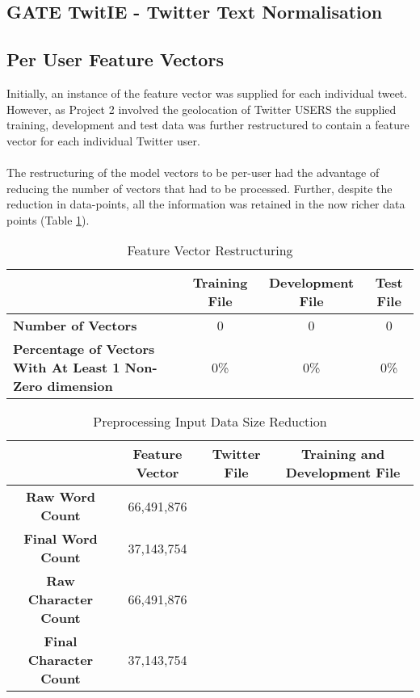\documentclass[11pt]{article}
\begin{document}
\subsection{GATE TwitIE - Twitter Text Normalisation}

\subsection{Per User Feature Vectors}
Initially, an instance of the feature vector was supplied for each individual tweet. However, as Project 2 involved the geolocation of Twitter USERS the supplied training, development and test data was further restructured to contain a feature vector for each individual Twitter user.\\\\
The restructuring of the model vectors to be per-user had the advantage of reducing the number of vectors that had to be processed. Further, despite the reduction in data-points, all the information was retained in the now richer data points (Table \ref{table:user-vectors-table}).

\begin{table} [ht]
\caption{Feature Vector Restructuring}
\centering
	\begin{tabular}{| p{6cm} | c | c | c |}
	\hline
	 & \textbf{Training File} & \textbf{Development File}  & \textbf{Test File}\\
	\hline
	\textbf{Number of Vectors} & 0 & 0 & 0\\
	\hline
	\textbf{Percentage of Vectors With At Least 1 Non-Zero dimension} & 0\% & 0\% & 0\%\\
	\hline
	\end{tabular}
\label{table:user-vectors-table}
\end{table}

\begin{table} [th]
\caption{Preprocessing Input Data Size Reduction}
\centering
	\begin{tabular}{| c | c | c | c |}
	\hline
	 & \textbf{Feature Vector} & \textbf{Twitter File}  & \textbf{Training and Development File}\\
	\hline
	\textbf{Raw Word Count} & 66,491,876 & &\\
	\hline
	\textbf{Final Word Count} & 37,143,754 & &\\
	\hline
	\hline
	\textbf{Raw Character Count} & 66,491,876 & &\\
	\hline
	\textbf{Final Character Count} & 37,143,754 & &\\
	\hline
	\end{tabular}
\label{table:input-table}
\end{table}
\end{document}
